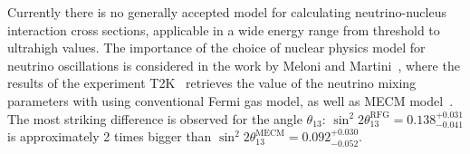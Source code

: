 Currently there is no generally accepted model for calculating neutrino-nucleus interaction cross sections, applicable in a wide energy range from threshold to ultrahigh values. The importance of the choice of nuclear physics model for neutrino oscillations is considered in the work by Meloni and Martini~\cite{Meloni:2012fq}, where the results of the experiment T2K~\cite{Abe:2011sj,Abe:2012gx} retrieves the value of the neutrino mixing parameters with using conventional Fermi gas model, as well as MECM model~\cite{Martini:2009uj}. The most striking difference is observed for the angle $\theta_{13}$: $\sin^{2}2\theta_{13}^{\textrm{RFG}}=0.138^{+0.031}_{-0.041}$ is approximately 2 times bigger than $\sin^{2}2\theta_{13}^{\textrm{MECM}}=0.092^{+0.030}_{-0.052}$.

